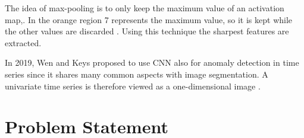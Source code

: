 The idea of max-pooling is to only keep the maximum value of an activation map,. In the orange region 7 represents the maximum value, so it is kept while the other values are discarded \parencite{RichStureborg2019}. Using this technique the sharpest features are extracted.

In 2019, Wen and Keys proposed to use CNN also for anomaly detection in time series since it shares many common aspects with image segmentation. A univariate time series is therefore viewed as a one-dimensional image \parencite{Wen2019}.\\ 





\section{Problem Statement} \label{Problem}

